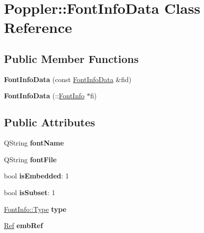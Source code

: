 \hypertarget{class_poppler_1_1_font_info_data}{}\section{Poppler\+:\+:Font\+Info\+Data Class Reference}
\label{class_poppler_1_1_font_info_data}
\subsection*{Public Member Functions}
\begin{DoxyCompactItemize}
\item 
\mbox{\label{class_poppler_1_1_font_info_data_a07c865b6c6ce2b0c277cdb3c6d6cb3e5}} 
{\bfseries Font\+Info\+Data} (const \hyperlink{class_poppler_1_1_font_info_data}{Font\+Info\+Data} \&fid)
\item 
\mbox{\label{class_poppler_1_1_font_info_data_aa03c95d4d01156ae619cc047138e3aef}} 
{\bfseries Font\+Info\+Data} (\+::\hyperlink{class_poppler_1_1_font_info}{Font\+Info} $\ast$fi)
\end{DoxyCompactItemize}
\subsection*{Public Attributes}
\begin{DoxyCompactItemize}
\item 
\mbox{\label{class_poppler_1_1_font_info_data_a1308e3039817eda8cf52eea64fb055d1}} 
Q\+String {\bfseries font\+Name}
\item 
\mbox{\label{class_poppler_1_1_font_info_data_a96692330caa6cc2ca4afa0d7ccb11416}} 
Q\+String {\bfseries font\+File}
\item 
\mbox{\label{class_poppler_1_1_font_info_data_a449c4bc92f727c3934a2923d6fcd5fb6}} 
bool {\bfseries is\+Embedded}\+: 1
\item 
\mbox{\label{class_poppler_1_1_font_info_data_ad03f00fef56e0a62b65938292507c0ea}} 
bool {\bfseries is\+Subset}\+: 1
\item 
\mbox{\label{class_poppler_1_1_font_info_data_a56a78322734e6a30e64c76a7584e09fb}} 
\hyperlink{class_poppler_1_1_font_info_a98fc6abbc1e3583d68751bd431e297ab}{Font\+Info\+::\+Type} {\bfseries type}
\item 
\mbox{\label{class_poppler_1_1_font_info_data_ac2cde4f6cfe2dd592666234b1a9ec894}} 
\hyperlink{struct_ref}{Ref} {\bfseries emb\+Ref}
\end{DoxyCompactItemize}


